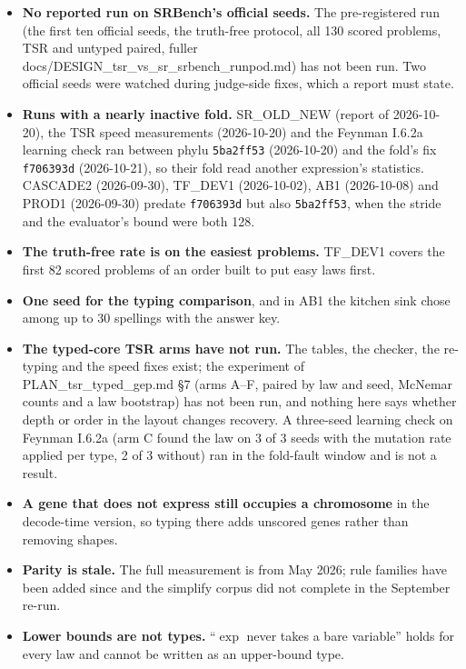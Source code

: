 \documentclass[sigconf,nonacm]{acmart}
\newcommand{\src}[1]{{\small\ttfamily #1}}
\begin{document}
\begin{itemize}
\item \textbf{No reported run on SRBench's official seeds.} The
pre-registered run (the first ten official seeds, the truth-free protocol, all
130 scored problems, TSR and untyped paired, \src{fuller
docs/\allowbreak{}DESIGN\_\allowbreak{}tsr\_\allowbreak{}vs\_\allowbreak{}sr\_\allowbreak{}srbench\_\allowbreak{}runpod.\allowbreak{}md}) has not been run. Two official
seeds were watched during judge-side fixes, which a report must state.
\item \textbf{Runs with a nearly inactive fold.} SR\_OLD\_NEW (report of
2026-10-20), the TSR speed measurements (2026-10-20) and the Feynman I.6.2a
learning check ran between phylu \texttt{5ba2ff53} (2026-10-20) and the fold's
fix \texttt{f706393d} (2026-10-21), so their fold read another expression's
statistics. CASCADE2 (2026-09-30), TF\_DEV1 (2026-10-02), AB1 (2026-10-08) and
PROD1 (2026-09-30) predate \texttt{f706393d} but also \texttt{5ba2ff53}, when
the stride and the evaluator's bound were both 128.
\item \textbf{The truth-free rate is on the easiest problems.} TF\_DEV1 covers
the first 82 scored problems of an order built to put easy laws first.
\item \textbf{One seed for the typing comparison}, and in AB1 the kitchen sink
chose among up to 30 spellings with the answer key.
\item \textbf{The typed-core TSR arms have not run.} The tables, the checker,
the re-typing and the speed fixes exist; the experiment of
\src{PLAN\_\allowbreak{}tsr\_\allowbreak{}typed\_\allowbreak{}gep.\allowbreak{}md} \S7 (arms A--F, paired by law and seed, McNemar
counts and a law bootstrap) has not been run, and nothing here says whether
depth or order in the layout changes recovery. A three-seed learning check on
Feynman I.6.2a (arm C found the law on 3 of 3 seeds with the mutation rate
applied per type, 2 of 3 without) ran in the fold-fault window and is not a
result.
\item \textbf{A gene that does not express still occupies a chromosome} in the
decode-time version, so typing there adds unscored genes rather than removing
shapes.
\item \textbf{Parity is stale.} The full measurement is from May 2026; rule
families have been added since and the simplify corpus did not complete in the
September re-run.
\item \textbf{Lower bounds are not types.} ``$\exp$ never takes a bare
variable'' holds for every law and cannot be written as an upper-bound type.
\end{itemize}
\end{document}
